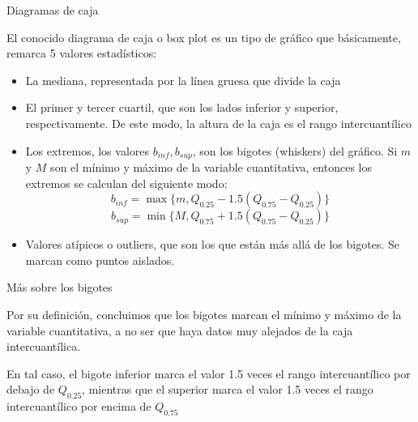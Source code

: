 \documentclass[
  ignorenonframetext,
]{beamer}
\providecommand{\tightlist}{%
  \setlength{\itemsep}{0pt}\setlength{\parskip}{0pt}}
\begin{document}
\begin{frame}{Diagramas de caja}
\protect\hypertarget{diagramas-de-caja-1}{}

El conocido diagrama de caja o box plot es un tipo de gráfico que
básicamente, remarca 5 valores estadísticos:

\begin{itemize}
\tightlist
\item
  La mediana, representada por la línea gruesa que divide la caja
\item
  El primer y tercer cuartil, que son los lados inferior y superior,
  respectivamente. De este modo, la altura de la caja es el rango
  intercuantílico
\item
  Los extremos, los valores \(b_{inf},b_{sup}\), son los bigotes
  (whiskers) del gráfico. Si \(m\) y \(M\) son el mínimo y máximo de la
  variable cuantitativa, entonces los extremos se calculan del siguiente
  modo: \[b_{inf}=\max\{m,Q_{0.25}-1.5(Q_{0.75}-Q_{0.25})\}\]
  \[b_{sup}=\min\{M,Q_{0.75}+1.5(Q_{0.75}-Q_{0.25})\}\]
\item
  Valores atípicos o outliers, que son los que están más allá de los
  bigotes. Se marcan como puntos aislados.
\end{itemize}

\end{frame}

\begin{frame}{Más sobre los bigotes}
\protect\hypertarget{muxe1s-sobre-los-bigotes}{}

Por su definición, concluimos que los bigotes marcan el mínimo y máximo
de la variable cuantitativa, a no ser que haya datos muy alejados de la
caja intercuantílica.

En tal caso, el bigote inferior marca el valor 1.5 veces el rango
intercuantílico por debajo de \(Q_{0.25}\), mientras que el superior
marca el valor 1.5 veces el rango intercuantílico por encima de
\(Q_{0.75}\)

\end{frame}
\end{document}
